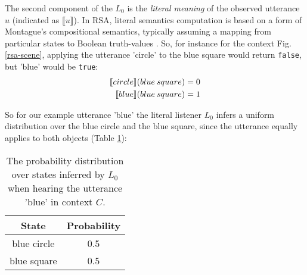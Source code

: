 The second component of the $L_0$ is the \emph{literal meaning} of the observed utterance $u$ (indicated as $\llbracket u \rrbracket$). In RSA, literal semantics computation is based on a form of Montague’s compositional semantics, typically assuming a mapping from particular states to Boolean truth-values \parencite{montague1973proper} \parencite[but see e.g.][for alternative approaches]{degen2020redundancy}. 
So, for instance for the context Fig. \ref{rsa-scene}, applying the utterance 'circle' to the blue square would return \texttt{false}, but 'blue' would be \texttt{true}:
\begin{align}
\llbracket circle \rrbracket (blue \: square) = 0 \notag \\
\llbracket blue \rrbracket (blue\: square) = 1
\end{align}
  
So for our example utterance 'blue' the literal listener $L_0$ infers a uniform distribution over the blue circle and the blue square, since the utterance equally applies to both objects (Table \ref{rsa-l0}):

\begin{table}[h]
	\begin{center}
		\caption{The probability distribution over states inferred by $L_0$ when hearing the utterance 'blue' in context $C$.}
		\label{rsa-l0}
		\vskip 0.12in
		\begin{tabular}{cc}
			State & Probability \\
			\hline
			blue circle & 0.5 \\
			blue square & 0.5 \\
			\hline
		\end{tabular}
	\end{center}
\end{table}

